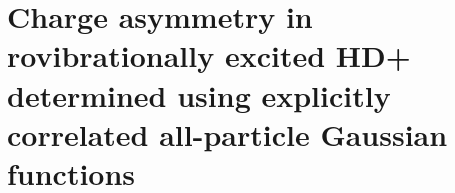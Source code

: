 \chapter{Charge asymmetry in rovibrationally excited HD+ determined
using explicitly correlated all-particle Gaussian functions\label{apndx5}}



